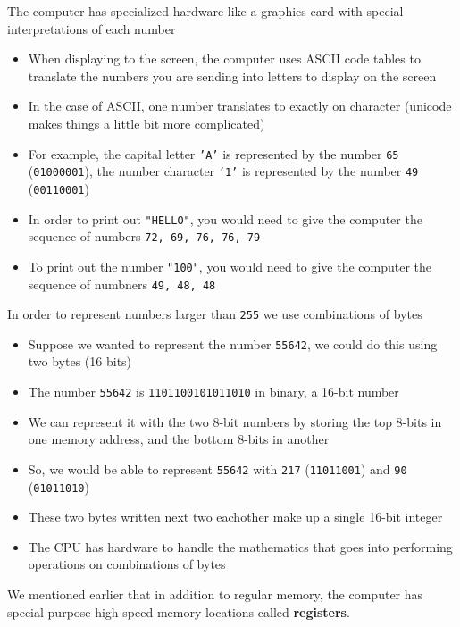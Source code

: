\documentclass{article}
\newcommand {\code}{\texttt}
\begin{document}
	The computer has specialized hardware like a graphics card with special interpretations
	of each number
	\begin {itemize}
		\item When displaying to the screen, the computer uses ASCII code tables to
			translate the numbers you are sending into letters to display on the screen
		\item In the case of ASCII, one number translates to exactly on character (unicode
			makes things a little bit more complicated)
		\item For example, the capital letter \code {'A'} is represented by the number
			\code {65} (\code {01000001}), the number character \code {'1'} is 
			represented by the number \code {49} (\code {00110001})
		\item In order to print out \code {"HELLO"}, you would need to give the computer
			the sequence of numbers \code {72, 69, 76, 76, 79}
		\item To print out the number \code {"100"}, you would need to give the computer
			the sequence of numbners \code {49, 48, 48}
	\end {itemize}
	
	In order to represent numbers larger than \code {255} we use combinations of bytes
	\begin {itemize}
		\item Suppose we wanted to represent the number \code {55642}, we could do this
			using two bytes (16 bits)
		\item The number \code {55642} is 
			{\color {red}\code {11011001}}{\color {blue}\code{01011010}} 
			in binary, a 16-bit
			number
		\item We can represent it with the two 8-bit numbers by storing the top 8-bits
			in one memory address, and the bottom 8-bits in another
		\item So, we would be able to represent \code {55642} with \code {217}
			({\color {red}\code {11011001}}) and \code {90} 
			({\color {blue}\code{01011010}})
		\item These two bytes written next two eachother make up a single 16-bit integer
		\item The CPU has hardware to handle the mathematics that goes into performing
			operations on combinations of bytes
	\end {itemize}
	
	We mentioned earlier that in addition to regular memory, the computer has special
	purpose high-speed memory locations called \textbf {registers}.
	
\end{document}
